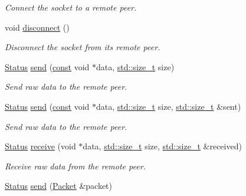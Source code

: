 \begin{DoxyCompactItemize}
\begin{DoxyCompactList}\small\item\em Connect the socket to a remote peer. \end{DoxyCompactList}\item 
void \hyperlink{classsf_1_1_tcp_socket_ac18f518a9be3d6be5e74b9404c253c1e}{disconnect} ()
\begin{DoxyCompactList}\small\item\em Disconnect the socket from its remote peer. \end{DoxyCompactList}\item 
\hyperlink{classsf_1_1_socket_a51bf0fd51057b98a10fbb866246176dc}{Status} \hyperlink{classsf_1_1_tcp_socket_affce26ab3bcc4f5b9269dad79db544c0}{send} (\hyperlink{term__entry_8h_a57bd63ce7f9a353488880e3de6692d5a}{const} void $\ast$data, \hyperlink{nc__alloc_8h_a7b60c5629e55e8ec87a4547dd4abced4}{std\-::size\-\_\-t} size)
\begin{DoxyCompactList}\small\item\em Send raw data to the remote peer. \end{DoxyCompactList}\item 
\hyperlink{classsf_1_1_socket_a51bf0fd51057b98a10fbb866246176dc}{Status} \hyperlink{classsf_1_1_tcp_socket_a31f5b280126a96c6f3ad430f4cbcb54d}{send} (\hyperlink{term__entry_8h_a57bd63ce7f9a353488880e3de6692d5a}{const} void $\ast$data, \hyperlink{nc__alloc_8h_a7b60c5629e55e8ec87a4547dd4abced4}{std\-::size\-\_\-t} size, \hyperlink{nc__alloc_8h_a7b60c5629e55e8ec87a4547dd4abced4}{std\-::size\-\_\-t} \&sent)
\begin{DoxyCompactList}\small\item\em Send raw data to the remote peer. \end{DoxyCompactList}\item 
\hyperlink{classsf_1_1_socket_a51bf0fd51057b98a10fbb866246176dc}{Status} \hyperlink{classsf_1_1_tcp_socket_a90ce50811ea61d4f00efc62bb99ae1af}{receive} (void $\ast$data, \hyperlink{nc__alloc_8h_a7b60c5629e55e8ec87a4547dd4abced4}{std\-::size\-\_\-t} size, \hyperlink{nc__alloc_8h_a7b60c5629e55e8ec87a4547dd4abced4}{std\-::size\-\_\-t} \&received)
\begin{DoxyCompactList}\small\item\em Receive raw data from the remote peer. \end{DoxyCompactList}\item 
\hyperlink{classsf_1_1_socket_a51bf0fd51057b98a10fbb866246176dc}{Status} \hyperlink{classsf_1_1_tcp_socket_a0f8276e2b1c75aac4a7b0a707b250f44}{send} (\hyperlink{classsf_1_1_packet}{Packet} \&packet)

\end{DoxyCompactItemize}
